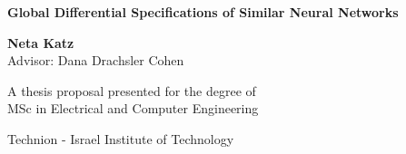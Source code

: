 
\begin{titlepage}
   \begin{center}

       \huge
       \textbf{Global Differential Specifications of Similar Neural Networks}

       \vspace*{1cm}






%

       \vspace{2.5cm}

        \Large
        \textbf{Neta Katz} \\
        
        Advisor: Dana Drachsler Cohen\\


       \vfill

       A thesis proposal presented for the degree of\\
       MSc in Electrical and Computer Engineering

       \vspace{0.8cm}


       Technion - Israel Institute of Technology\\

   \end{center}
\end{titlepage} 